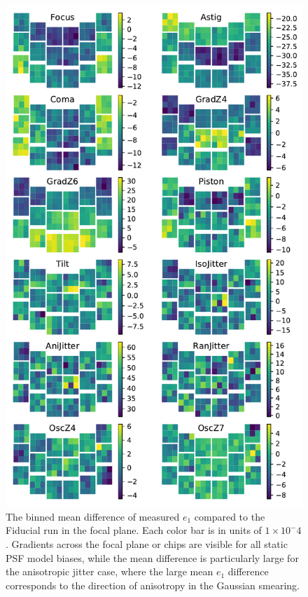 \documentclass[aps,prd, amsmath,amssymb,superscriptaddress,showkeys,nofootinbib,reprint,preprintnumbers]{revtex4-1}
\begin{document}
\begin{figure}
\begin{center}
\includegraphics[width=\columnwidth]{figures/focal_mean_e1.pdf}
\end{center}
\caption[]{
The binned mean difference of measured $e_1$ compared to the Fiducial run in the focal plane. Each color bar is in units of $1\times 10^-4$. Gradients across the focal plane or chips are visible for all static PSF model biases, while the mean difference is particularly large for the anisotropic jitter case, where the large mean $e_1$ difference corresponds to the direction of anisotropy in the Gaussian smearing.
\label{fig:focal_mean_e1}}
\end{figure}
\end{document}
